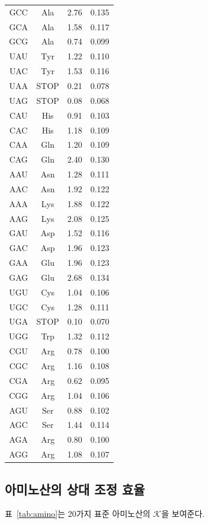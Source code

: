 \documentclass[12pt,a4paper]{article}
\newcommand{\REL}{\mathcal{K}}          %
\begin{document}
\begin{longtable}{|c|c|c|c|}
		GCC & Ala & 2.76 & 0.135 \\
		GCA & Ala & 1.58 & 0.117 \\
		GCG & Ala & 0.74 & 0.099 \\
		UAU & Tyr & 1.22 & 0.110 \\
		UAC & Tyr & 1.53 & 0.116 \\
		UAA & STOP & 0.21 & 0.078 \\
		UAG & STOP & 0.08 & 0.068 \\
		CAU & His & 0.91 & 0.103 \\
		CAC & His & 1.18 & 0.109 \\
		CAA & Gln & 1.20 & 0.109 \\
		CAG & Gln & 2.40 & 0.130 \\
		AAU & Asn & 1.28 & 0.111 \\
		AAC & Asn & 1.92 & 0.122 \\
		AAA & Lys & 1.88 & 0.122 \\
		AAG & Lys & 2.08 & 0.125 \\
		GAU & Asp & 1.52 & 0.116 \\
		GAC & Asp & 1.96 & 0.123 \\
		GAA & Glu & 1.96 & 0.123 \\
		GAG & Glu & 2.68 & 0.134 \\
		UGU & Cys & 1.04 & 0.106 \\
		UGC & Cys & 1.28 & 0.111 \\
		UGA & STOP & 0.10 & 0.070 \\
		UGG & Trp & 1.32 & 0.112 \\
		CGU & Arg & 0.78 & 0.100 \\
		CGC & Arg & 1.16 & 0.108 \\
		CGA & Arg & 0.62 & 0.095 \\
		CGG & Arg & 1.04 & 0.106 \\
		AGU & Ser & 0.88 & 0.102 \\
		AGC & Ser & 1.44 & 0.114 \\
		AGA & Arg & 0.80 & 0.100 \\
		AGG & Arg & 1.08 & 0.107 \\
		\hline
	\end{longtable}
	
	\subsection{아미노산의 상대 조정 효율}
	\label{sec:aminoacids}
	표~\ref{tab:amino}는 20가지 표준 아미노산의 \(\REL\)을 보여준다.
	
\end{document}

